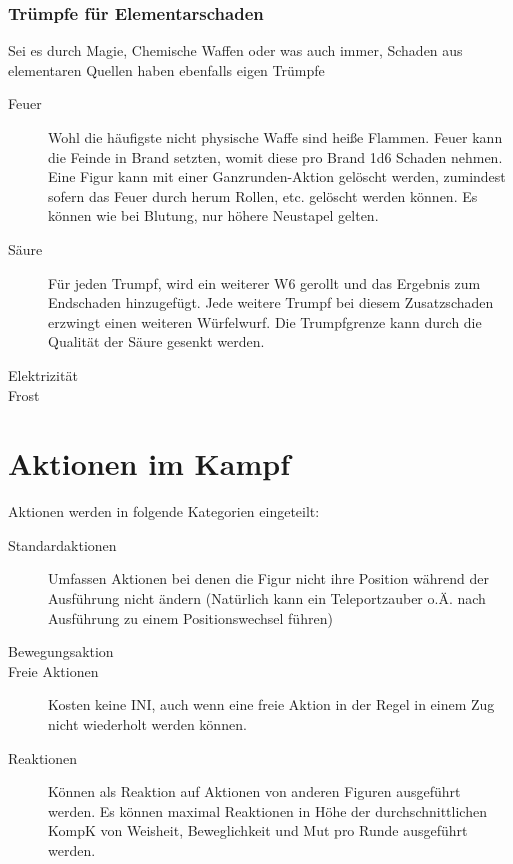 \documentclass[a4paper,12pt,oneside]{book}
\begin{document}
\subsection{Trümpfe für Elementarschaden}
Sei es durch Magie, Chemische Waffen oder was auch immer, Schaden aus elementaren Quellen haben ebenfalls eigen Trümpfe
\begin{description}
\item[Feuer]Wohl die häufigste nicht physische Waffe sind heiße Flammen. Feuer kann die Feinde in Brand setzten, womit diese pro Brand 1d6 Schaden nehmen. Eine Figur kann mit einer Ganzrunden-Aktion gelöscht werden, zumindest sofern das Feuer durch herum Rollen, etc. gelöscht werden können. Es können wie bei Blutung, nur höhere Neustapel gelten.
\item[Säure]Für jeden Trumpf, wird ein weiterer W6 gerollt und das Ergebnis zum Endschaden hinzugefügt. Jede weitere Trumpf bei diesem Zusatzschaden erzwingt einen weiteren Würfelwurf. Die Trumpfgrenze kann durch die Qualität der Säure gesenkt werden.
\item[Elektrizität]
\item[Frost]
\end{description}


\chapter{Aktionen im Kampf}
Aktionen werden in folgende Kategorien eingeteilt:
\begin{description}
\item[Standardaktionen]Umfassen Aktionen bei denen die Figur nicht ihre Position während der Ausführung nicht ändern (Natürlich kann ein Teleportzauber o.Ä. nach Ausführung zu einem Positionswechsel führen)
\item[Bewegungsaktion]
\item[Freie Aktionen]Kosten keine INI, auch wenn eine freie Aktion in der Regel in einem Zug nicht wiederholt werden können.
\item[Reaktionen]Können als Reaktion auf Aktionen von anderen Figuren ausgeführt werden. Es können maximal Reaktionen in Höhe der durchschnittlichen KompK von Weisheit, Beweglichkeit und Mut pro Runde ausgeführt werden. 
\end{description}
\end{document}
